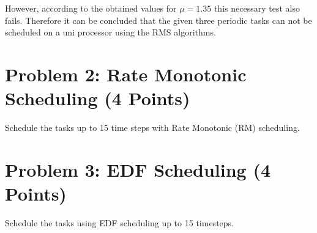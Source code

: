 \documentclass[11pt,letterpaper]{article}
\begin{document}
However, according to the obtained values for $\mu = 1.35$ this necessary test also fails. Therefore it can be concluded that the given three periodic tasks can not be scheduled on  a uni processor using the RMS algorithms.
	\newpage
	\section*{Problem 2: Rate Monotonic Scheduling (4 Points)}
	
	Schedule the tasks up to 15 time steps with Rate Monotonic (RM) scheduling.
	
	\begin{figure}[h]
		\centering
	\end{figure}
	
	\newpage
	\section*{Problem 3: EDF Scheduling (4 Points)}
	
	Schedule the tasks using EDF scheduling up to 15 timesteps.
	
	
	\begin{figure}[h]
		\centering
	\end{figure}
	
\end{document}
